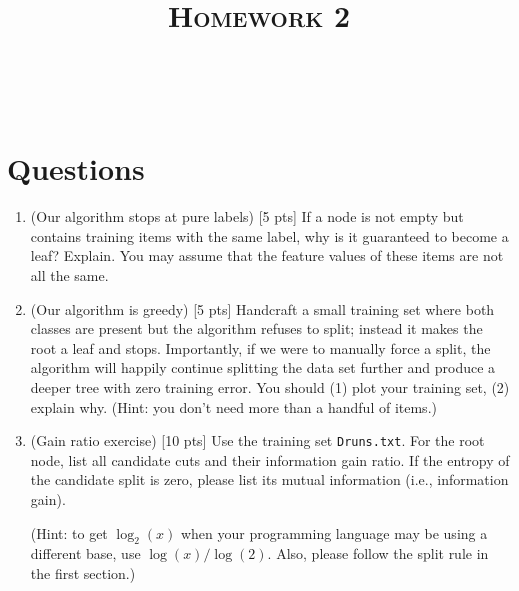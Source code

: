 \documentclass[a4paper]{article}
\title{\textsc{Homework 2}} %
\author{
\red{$>>$NAME HERE$<<$} \\
\red{$>>$WISC ID HERE$<<$}\\
}
\date{}
\theoremstyle{definition}
\newcommand{\1}{\Ind}
\begin{document}
\maketitle 

\section{Questions}
\begin{enumerate}
    \item  (Our algorithm stops at pure labels) [5 pts] If a node is not empty but contains training items with the same label, why is it guaranteed to become a leaf? Explain. You may assume that the feature values of these items are not all the same. 
\item (Our algorithm is greedy) [5 pts] Handcraft a small training set where both classes are present but the algorithm refuses to split; instead it makes the root a leaf and stops. Importantly, if we were to manually force a split, the algorithm will happily continue splitting the data set further and produce a deeper tree with zero training error. You should (1) plot your training set, (2) explain why. (Hint: you don't need more than a handful of items.) 
\item (Gain ratio exercise) [10 pts] Use the training set {\tt Druns.txt}. For the root node, list all candidate cuts and their information gain ratio. If the entropy of the candidate split is zero, please list its mutual information (i.e., information gain). 

(Hint: to get $\log_2(x)$ when your programming language may be using a different base, use $\log(x)/\log(2)$. Also, please follow the split rule in the first section.)



\end{enumerate}
\end{document}
